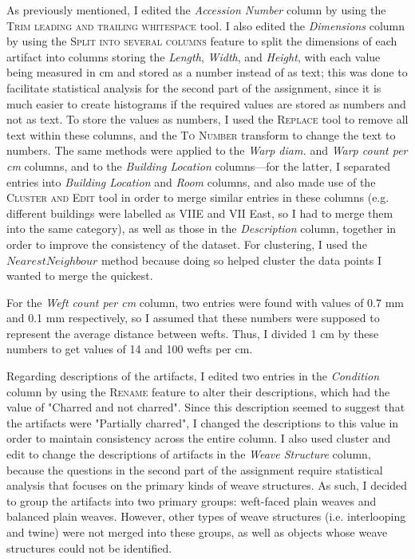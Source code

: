\documentclass[answers]{exam}
\begin{document}
\begin{parts}
\color{nr}\quad\quad As previously mentioned, I edited the \textit{Accession Number} column by using the \textsc{Trim leading and trailing whitespace} tool. I also edited the \textit{Dimensions} column by using the \textsc{Split into several columns} feature to split the dimensions of each artifact into columns storing the \textit{Length}, \textit{Width}, and \textit{Height}, with each value being measured in cm and stored as a number instead of as text; this was done to facilitate statistical analysis for the second part of the assignment, since it is much easier to create histograms if the required values are stored as numbers and not as text. To store the values as numbers, I used the \textsc{Replace} tool to remove all text within these columns, and the \textsc{To Number} transform to change the text to numbers. The same methods were applied to the \textit{Warp diam.} and \textit{Warp count per cm} columns, and to the \textit{Building Location} columns---for the latter, I separated entries into \textit{Building Location} and \textit{Room} columns, and also made use of the \textsc{Cluster and Edit} tool in order to merge similar entries in these columns  (e.g. different buildings were labelled as VIIE and VII East, so I had to merge them into the same category), as well as those in the \textit{Description} column, together in order to improve the consistency of the dataset. For clustering, I used the $Nearest Neighbour$ method because doing so helped cluster the data points I wanted to merge the quickest.

\quad\quad For the \textit{Weft count per cm} column, two entries were found with values of 0.7 mm and 0.1 mm respectively, so I assumed that these numbers were supposed to represent the average distance between wefts. Thus, I divided 1 cm by these numbers to get values of 14 and 100 wefts per cm.

\quad\quad Regarding descriptions of the artifacts, I edited two entries in the \textit{Condition} column by using the \textsc{Rename} feature to alter their descriptions, which had the value of "Charred and not charred". Since this description seemed to suggest that the artifacts were "Partially charred", I changed the descriptions to this value in order to maintain consistency across the entire column. I also used cluster and edit to change the descriptions of artifacts in the \textit{Weave Structure} column, because the questions in the second part of the assignment require statistical analysis that focuses on the primary kinds of weave structures. As such, I decided to group the artifacts into two primary groups: weft-faced plain weaves and balanced plain weaves. However, other types of weave structures (i.e. interlooping and twine) were not merged into these groups, as well as objects whose weave structures could not be identified.


\end{parts}
\end{document}
